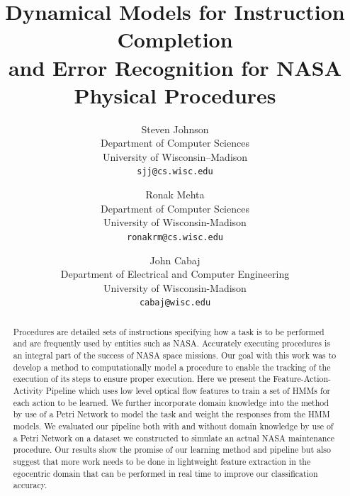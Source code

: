 \documentclass[10pt,twocolumn,letterpaper]{article}
\begin{document}
\title{Dynamical Models for Instruction Completion \\and Error Recognition for NASA Physical Procedures}

\author{Steven Johnson\\
	Department of Computer Sciences\\
	University of Wisconsin--Madison\\
	{\tt\small sjj@cs.wisc.edu}
	\and
	Ronak Mehta\\
	Department of Computer Sciences\\
	University of Wisconsin-Madison\\
	{\tt\small ronakrm@cs.wisc.edu}
	\and
	John Cabaj\\
	Department of Electrical and Computer Engineering\\
	University of Wisconsin-Madison\\
	{\tt\small cabaj@wisc.edu}
}

\maketitle

\begin{abstract}

Procedures are detailed sets of instructions specifying how a task is to be performed and are frequently used by entities such as NASA. Accurately executing procedures is an integral part of the success of NASA space missions. Our goal with this work was to develop a method to computationally model a procedure to enable the tracking of the execution of its steps to ensure proper execution. Here we present the Feature-Action-Activity Pipeline which uses low level optical flow features to train a set of HMMs for each action to be learned. We further incorporate domain knowledge into the method by use of a Petri Network to model the task and weight the responses from the HMM models. We evaluated our pipeline both with and without domain knowledge by use of a Petri Network on a dataset we constructed to simulate an actual NASA maintenance procedure. Our results show the promise of our learning method and pipeline but also suggest that more work needs to be done in lightweight feature extraction in the egocentric domain that can be performed in real time to improve our classification accuracy.

\end{abstract}

\end{document}
